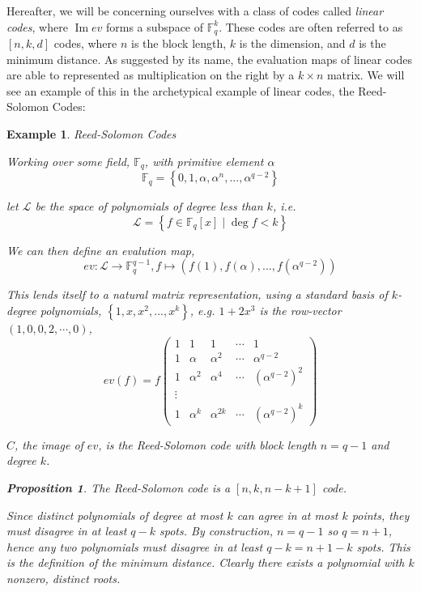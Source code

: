 \documentclass[12pt]{amsart}
\newenvironment{pf}{\proof[\proofname]}{\endproof}
\theoremstyle{plain}
\newtheorem{Proposition}[Th]{Proposition}
\newtheorem{example}[Th]{Example}
\newcommand{\F}{\mathbb{F}}
\DeclareMathOperator{\im}{Im}
\begin{document}
Hereafter, we will be concerning ourselves with a class of codes called \emph{linear codes}, where $\im ev$ forms a subspace of $\F_q^k$. These codes are often referred to as $\left[n,k,d\right]$ codes, where $n$ is the block length, $k$ is the dimension, and $d$ is the minimum distance. As suggested by its name, the evaluation maps of linear codes are able to represented as multiplication on the right by a $k \times n$ matrix. We will see an example of this in the archetypical example of linear codes, the Reed-Solomon Codes:


\begin{example}Reed-Solomon Codes

Working over some field, $\F_q$, with primitive element $\alpha$
\begin{equation*}
\F_q = \left\{0,1,\alpha,\alpha^n,...,\alpha^{q-2}\right\}
\end{equation*}

let $\mathscr{L}$ be the space of polynomials of degree less than $k$, i.e.
\begin{equation*}
\mathscr{L} = \left\{f \in \F_q[x] \mid \deg f < k\right\}
\end{equation*}

We can then define an evalution map,
\begin{equation*}
ev: \mathscr{L} \to \F_q^{q-1} , f \mapsto \left(f(1),f(\alpha),...,f(\alpha^{q-2}) \right) 
\end{equation*}

This lends itself to a natural matrix representation, using a standard basis of $k$-degree polynomials, $\left\{1,x,x^2,...,x^k\right\}$, e.g. $1+2x^3$ is the row-vector $(1,0,0,2,\cdots,0)$, 
\begin{equation*}
ev(f) = f\left( \begin{array}{ccccc}
1 & 1 & 1 & \cdots & 1  \\
1 & \alpha & \alpha^2 & \cdots & \alpha^{q-2} \\
1 & \alpha^2 & \alpha^4 & \cdots & (\alpha^{q-2})^2 \\
\vdots &  & & & \\
1 & \alpha^k & \alpha^{2k} & \cdots & (\alpha^{q-2})^k \end{array} \right)
\end{equation*}

$C$, the image of $ev$, is the Reed-Solomon code with block length $n=q-1$ and degree $k$. 
\begin{Proposition} The Reed-Solomon code is a $\left[n,k,n-k+1\right]$ code.
\end{Proposition}
\begin{pf}
Since distinct polynomials of degree at most $k$ can agree in at most $k$ points, they must disagree in at least $q-k$ spots. By construction, $n=q-1$ so $q=n+1$, hence any two polynomials must disagree in at least $q-k = n+1-k$ spots. This is the definition of the minimum distance. Clearly there exists a polynomial with $k$ nonzero, distinct roots.
\end{pf}
\end{example}
\end{document}
